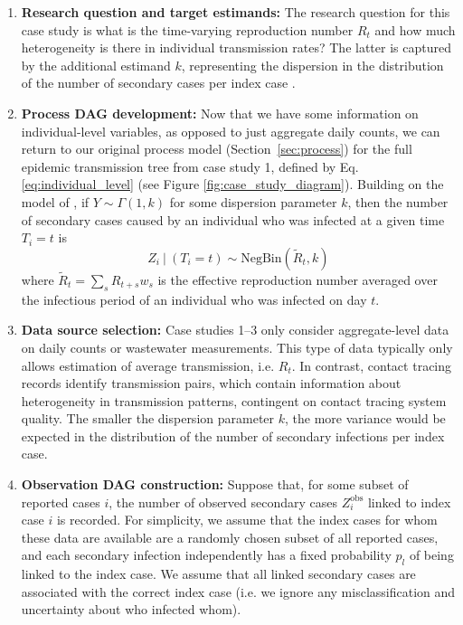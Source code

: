 \documentclass{article}
\begin{document}
\begin{enumerate}
   \item \textbf{Research question and target estimands:} The research question for this case study is what is the time-varying reproduction number $R_t$ and how much heterogeneity is there in individual transmission rates? The latter is captured by the additional estimand $k$, representing the dispersion in the distribution of the number of secondary cases per index case \citep{lloyd2005superspreading}. 
   
    \item \textbf{Process DAG development:} Now that we have some information on individual-level variables, as opposed to just aggregate daily counts, we can return to our original process model (Section~\ref{sec:process}) for the full epidemic transmission tree from case study 1, defined by Eq. \eqref{eq:individual_level} (see Figure \ref{fig:case_study_diagram}). 
    Building on the model of \citet{lloyd2005superspreading}, if $Y\sim \Gamma(1,k)$ for some dispersion parameter $k$, then the number of secondary cases caused by an individual who was infected at a given time $T_i=t$ is
     \begin{equation} \label{eq:offspring_dist}
        Z_i \ | \ (T_i=t) \sim \mathrm{NegBin}\left( \tilde{R}_{t}, k\right)
    \end{equation}   
    where $\tilde{R}_t= \sum_s R_{t+s} w_s$ is the effective reproduction number averaged over the infectious period of an individual who was infected on day $t$.
   
    \item \textbf{Data source selection:} Case studies 1--3 only consider aggregate-level data on daily counts or wastewater measurements. This type of data typically only allows estimation of average transmission, i.e. $R_t$. In contrast, contact tracing records identify transmission pairs, which contain information about heterogeneity in transmission patterns, contingent on contact tracing system quality. The smaller the dispersion parameter $k$, the more variance would be expected in the distribution of the number of secondary infections per index case.
    
    \item \textbf{Observation DAG construction:} Suppose that, for some subset of reported cases $i$, the number of observed secondary cases $Z^\mathrm{obs}_i$ linked to index case $i$ is recorded. For simplicity, we assume that the index cases for whom these data are available are a randomly chosen subset of all reported cases, and each secondary infection independently has a fixed probability $p_l$ of being linked to the index case. We assume that all linked secondary cases are associated with the correct index case (i.e. we ignore any misclassification and uncertainty about who infected whom). 


\end{enumerate}
\end{document}
